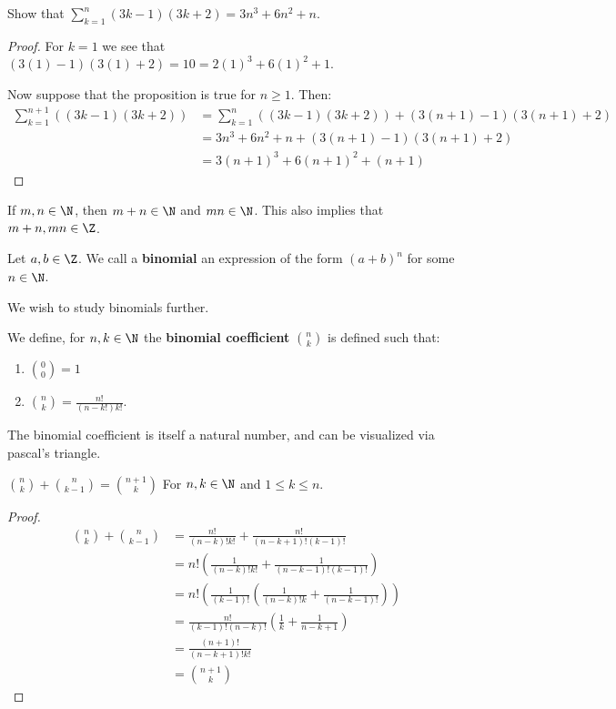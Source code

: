 \begin{example}
  Show that $\sum_{k=1}^{n} (3k-1)(3k+2)=3n^3+6n^2+n$.
\end{example}
\begin{proof}
  For $k=1$ we see that $(3(1)-1)(3(1)+2)=10=2(1)^3+6(1)^2+1$.

  Now suppose that the proposition is true for $n \geq 1$. Then:
      \begin{align*}
        \sum_{k=1}^{n+1} ((3k-1)(3k+2)) &= \sum_{k=1}^{n} ((3k-1)(3k+2))+(3(n+1)-1)(3(n+1)+2) \\
        &= 3n^3+6n^2+n+(3(n+1)-1)(3(n+1)+2) \\
        &= 3(n+1)^3+6(n+1)^2+(n+1)
      \end{align*}
\end{proof}

\begin{remark}
  If $m,n \in \N$, then $m+n \in \N$ and $mn \in \N$. This also implies that $m+n, mn \in \Z$.
\end{remark}

\begin{definition}
  Let $a,b \in \Z$. We call a \textbf{binomial} an expression of the form $(a+b)^n$ for some $n \in \N$.
\end{definition}

We wish to study binomials further.

\begin{definition}
  We define, for $n,k \in \N$ the \textbf{binomial coefficient} $n \choose k$ is defined such that:
    \begin{enumerate}[label=(\arabic*)]
      \item ${0 \choose 0} =1$

      \item ${n \choose k}=\frac{n!}{(n-k!)k!}$.
    \end{enumerate}
\end{definition}

The binomial coefficient is itself a natural number, and can be visualized via pascal's triangle.

\begin{lemma}\label{lemma1.2.2}
  ${n \choose k}+{n \choose k-1}={n+1 \choose k}$ For $n,k \in \N$ and $1 \leq k \leq n$.
\end{lemma}
\begin{proof}
  \begin{align}
    {n \choose k}+{n \choose k-1} &= \frac{n!}{(n-k)!k!}+\frac{n!}{(n-k+1)!(k-1)!} \\
                                  &=  n!(\frac{1}{(n-k)!k!}+\frac{1}{(n-k-1)!(k-1)!}) \\
                                  &= n!(\frac{1}{(k-1)!}(\frac{1}{(n-k)!k}+\frac{1}{(n-k-1)!}))\\
                                  &=\frac{n!}{(k-1)!(n-k)!}(\frac{1}{k}+\frac{1}{n-k+1})\\
                                  &= \frac{(n+1)!}{(n-k+1)!k!} \\
                                  &= {n+1 \choose k}
  \end{align}
\end{proof}

